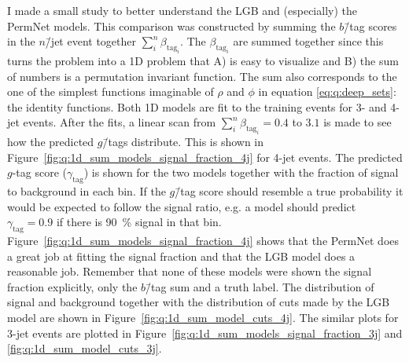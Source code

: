 I made a small study to better understand the LGB and (especially) the PermNet models. This comparison was constructed by summing the $b$\=/tag scores in the $n$\=/jet event together $\sum_i^n \beta_{\mathrm{tag}_i}$. The $\beta_{\mathrm{tag}_i}$ are summed together since this turns the problem into a \num{1}D problem that A) is easy to visualize and B) the sum of numbers is a permutation invariant function. The sum also corresponds to the one of the simplest functions imaginable of $\rho$ and $\phi$ in equation \eqref{eq:q:deep_sets}: the identity functions. Both 1D models are fit to the training events for 3- and 4-jet events. After the fits, a linear scan from $\sum_i^n \beta_{\mathrm{tag}_i}=0.4$ to $3.1$ is made to see how the predicted $g$\=/tags distribute. This is shown in Figure~\ref{fig:q:1d_sum_models_signal_fraction_4j} for 4-jet events. The predicted $g$-tag score ($\gamma_\mathrm{tag}$) is shown for the two models together with the fraction of signal to background in each bin. If the $g$\=/tag score should resemble a true probability it would be expected to follow the signal ratio, e.g. a model should predict $\gamma_\mathrm{tag}=0.9$ if there is \SI{90}{\percent} signal in that bin. Figure~\ref{fig:q:1d_sum_models_signal_fraction_4j} shows that the PermNet does a great job at fitting the signal fraction and that the LGB model does a reasonable job. Remember that none of these models were shown the signal fraction explicitly, only the $b$\=/tag sum and a truth label. The distribution of signal and background together with the distribution of cuts made by the LGB model are shown in Figure~\ref{fig:q:1d_sum_model_cuts_4j}. The similar plots for 3-jet events are plotted in Figure~\ref{fig:q:1d_sum_models_signal_fraction_3j} and \ref{fig:q:1d_sum_model_cuts_3j}.


